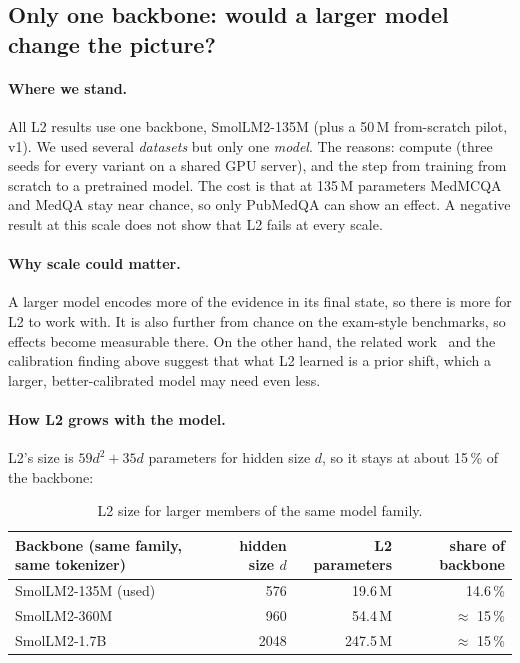 \documentclass[a4paper,11pt,parskip=half]{scrartcl}
\begin{document}
\subsection{Only one backbone: would a larger model change the picture?}
\label{sec:scale}

\paragraph{Where we stand.} All L2 results use one backbone, SmolLM2-135M (plus a 50\,M from-scratch pilot, v1). We used several \emph{datasets} but only one \emph{model}. The reasons: compute (three seeds for every variant on a shared GPU server), and the step from training from scratch to a pretrained model. The cost is that at 135\,M parameters MedMCQA and MedQA stay near chance, so only PubMedQA can show an effect. A negative result at this scale does not show that L2 fails at every scale.

\paragraph{Why scale could matter.} A larger model encodes more of the evidence in its final state, so there is more for L2 to work with. It is also further from chance on the exam-style benchmarks, so effects become measurable there. On the other hand, the related work~\cite{rauba2026tiny,smit2024mad} and the calibration finding above suggest that what L2 learned is a prior shift, which a larger, better-calibrated model may need even less.

\paragraph{How L2 grows with the model.} L2's size is $59d^2 + 35d$ parameters for hidden size $d$, so it stays at about 15\,\% of the backbone:

\begin{table}[H]
\centering\small
\begin{tabularx}{\linewidth}{@{}YrrR@{}}
\toprule
Backbone (same family, same tokenizer) & hidden size $d$ & L2 parameters & share of backbone\\
\midrule
SmolLM2-135M (used) & 576 & 19.6\,M & 14.6\,\%\\
SmolLM2-360M & 960 & 54.4\,M & $\approx$ 15\,\%\\
SmolLM2-1.7B & 2048 & 247.5\,M & $\approx$ 15\,\%\\
\bottomrule
\end{tabularx}
\caption{L2 size for larger members of the same model family.}
\end{table}
\end{document}

